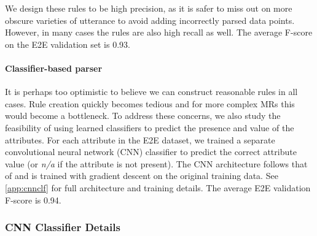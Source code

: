 We design these rules to be high precision, as it is safer to miss out on 
more obscure varieties of utterance to avoid adding incorrectly parsed data 
points.
However,  in many cases the rules are also high recall as well. 
The average F-score on the E2E validation set is 0.93.





\paragraph{Classifier-based parser \learnedclf} 
It is perhaps too optimistic to believe we can construct reasonable rules
in all cases. Rule creation quickly becomes tedious and for more complex
MRs this would become a bottleneck. To address these concerns, we also 
study the feasibility of using learned classifiers to predict the presence
and value of the attributes. For each attribute in the E2E dataset,
we trained a separate convolutional neural network (CNN) classifier 
to predict the correct attribute value (or \textit{n/a} if the attribute is 
not present).
The CNN architecture follows that of \citet{kim2014convolutional} and is 
trained with 
gradient descent on the original training data. See \autoref{app:cnnclf} for
full architecture and training details.
The average E2E validation F-score is 0.94.



\subsubsection{CNN Classifier Details}
\label{app:cnnclf}


